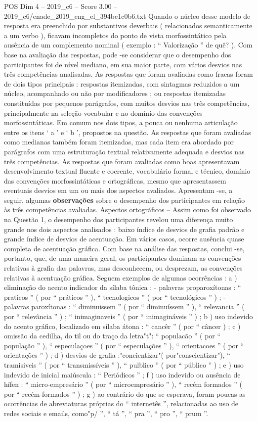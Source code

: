 \begin{textsample}{POS Dim 4 – 2019\_c6 – Score 3.00 – 2019\_c6/enade\_2019\_eng\_el\_394be1c0b6.txt}
Quando o núcleo desse modelo de resposta era preenchido por substantivos deverbais ( relacionados semanticamente a um verbo ), ficavam incompletos do ponto de vista morfossintático pela ausência de um complemento nominal ( exemplo : “ Valorização ” de quê? ).
Com base na avaliação das respostas, pode -se considerar que o desempenho dos participantes foi de nível mediano, em sua maior parte, com vários desvios nas três competências analisadas.
As respostas que foram avaliadas como fracas foram de dois tipos principais : respostas itemizadas, com sintagmas reduzidos a um núcleo, acompanhado ou não por modificadores ; ou respostas itemizadas constituídas por pequenos parágrafos, com muitos desvios nas três competências, principalmente na seleção vocabular e no domínio das convenções morfossintáticas.
Em comum nos dois tipos, a pouca ou nenhuma articulação entre os itens ‘ a ’ e ‘ b ’, propostos na questão.
As respostas que foram avaliadas como medianas também foram itemizadas, mas cada item era abordado por parágrafos com uma estruturação textual relativamente adequada e desvios nas três competências.
As respostas que foram avaliadas como boas apresentavam desenvolvimento textual fluente e coerente, vocabulário formal e técnico, domínio das convenções morfossintáticas e ortográficas, mesmo que apresentassem eventuais desvios em um ou mais dos aspectos avaliados.
Apresentam -se, a seguir, algumas \textbf{observações} sobre o desempenho dos participantes em relação às três competências avaliadas.
Aspectos ortográficos – Assim como foi observado na Questão 1, o desempenho dos participantes revelou uma diferença muito grande nos dois aspectos analisados : baixo índice de desvios de grafia padrão e grande índice de desvios de acentuação.
Em vários casos, ocorre ausência quase completa de acentuação gráfica.
Com base na análise das respostas, conclui -se, portanto, que, de uma maneira geral, os participantes dominam as convenções relativas à grafia das palavras, mas desconhecem, ou desprezam, as convenções relativas à acentuação gráfica.
Seguem exemplos de algumas ocorrências : a ) eliminação do acento indicador da sílaba tônica : - palavras proparoxítonas : “ praticos ” ( por “ práticos ” ), “ tecnologicos ” ( por “ tecnológicos ” ) ; - palavras paroxítonas : “ diminuissem ” ( por “ diminuíssem ” ), “ relevancia ” ( por “ relevância ” ) ; “ inimaginaveis ” ( por “ inimagináveis ” ) ; b ) uso indevido do acento gráfico, localizado em sílaba átona : “ cancêr ” ( por “ câncer ) ; c ) omissão da cedilha, do til ou do traço da letra"t": “ populacão ” ( por “ população ” ), “ especulaçoes ” ( por “ especulações ” ), “ orientacoes ” ( por “ orientações ” ) ; d ) desvios de grafia :"concientizar"( por"conscientizar"), “ tramisiveis ” ( por “ transmissíveis ” ), “ pulblico ” ( por “ público ” ) ; e ) uso indevido de inicial maiúscula : “ Periódicos ” ; f ) uso indevido ou ausência de hífen : “ micro-empresário ” ( por “ microempresário ” ), “ recém formados ” ( por “ recém-formados ” ) ; g ) ao contrário do que se esperava, foram poucas as ocorrências de abreviaturas próprias do “ internetês ”, relacionadas ao uso de redes sociais e emails, como"p/ ”, “ tá ”, “ pra ”, “ pro ”, “ prum ”.

\end{textsample}
